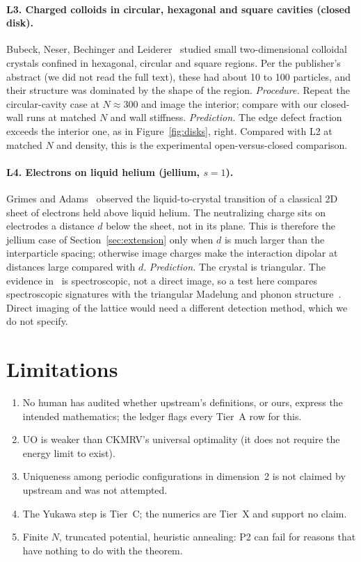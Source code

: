 \documentclass[11pt]{article}
\begin{document}
\paragraph{L3. Charged colloids in circular, hexagonal and square cavities (closed disk).} Bubeck, Neser, Bechinger
and Leiderer~\cite{bubeck} studied small two-dimensional colloidal crystals confined in hexagonal, circular and square
regions. Per the publisher's abstract (we did not read the full text), these had about 10 to 100 particles, and their
structure was dominated by the shape of the region.
\emph{Procedure.} Repeat the circular-cavity case at $N\approx300$ and image the interior; compare with our
closed-wall runs at matched $N$ and wall stiffness.
\emph{Prediction.} The edge defect fraction exceeds the interior one, as in Figure~\ref{fig:disks}, right. Compared
with L2 at matched $N$ and density, this is the experimental open-versus-closed comparison.

\paragraph{L4. Electrons on liquid helium (jellium, $s=1$).} Grimes and Adams~\cite{grimes} observed the
liquid-to-crystal transition of a classical 2D sheet of electrons held above liquid helium. The neutralizing charge
sits on electrodes a distance $d$ below the sheet, not in its plane. This is therefore the jellium case of
Section~\ref{sec:extension} only when $d$ is much larger than the interparticle spacing; otherwise image charges make
the interaction dipolar at distances large compared with $d$.
\emph{Prediction.} The crystal is triangular. The evidence in~\cite{grimes} is spectroscopic, not a direct image, so a
test here compares spectroscopic signatures with the triangular Madelung and phonon structure~\cite{bm}. Direct
imaging of the lattice would need a different detection method, which we do not specify.

\section{Limitations}
\begin{enumerate}
\item No human has audited whether upstream's definitions, or ours, express the intended mathematics; the ledger flags
every Tier~A row for this.
\item $\mathrm{UO}$ is weaker than CKMRV's universal optimality (it does not require the energy limit to exist).
\item Uniqueness among periodic configurations in dimension~2 is not claimed by upstream and was not attempted.
\item The Yukawa step is Tier~C; the numerics are Tier~X and support no claim.
\item Finite $N$, truncated potential, heuristic annealing: P2 can fail for reasons that have nothing to do with the
theorem.
\end{enumerate}
\end{document}
